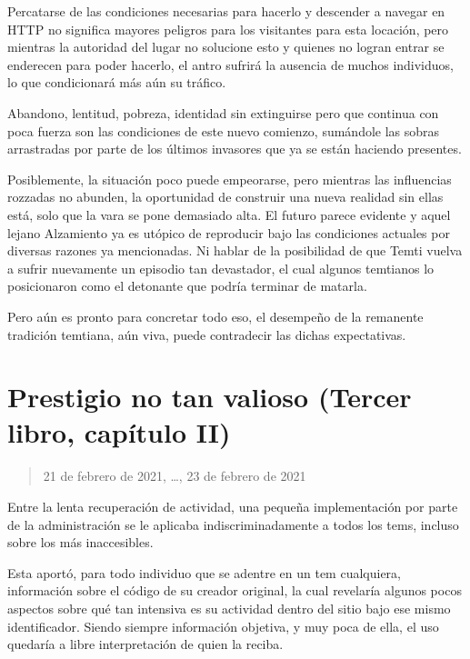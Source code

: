 \documentclass[
]{book}
\begin{document}
Percatarse de las condiciones necesarias para hacerlo y descender a navegar en HTTP no significa mayores peligros para los visitantes para esta locación, pero mientras la autoridad del lugar no solucione esto y quienes no logran entrar se enderecen para poder hacerlo, el antro sufrirá la ausencia de muchos individuos, lo que condicionará más aún su tráfico.

Abandono, lentitud, pobreza, identidad sin extinguirse pero que continua con poca fuerza son las condiciones de este nuevo comienzo, sumándole las sobras arrastradas por parte de los últimos invasores que ya se están haciendo presentes.

Posiblemente, la situación poco puede empeorarse, pero mientras las influencias rozzadas no abunden, la oportunidad de construir una nueva realidad sin ellas está, solo que la vara se pone demasiado alta. El futuro parece evidente y aquel lejano Alzamiento ya es utópico de reproducir bajo las condiciones actuales por diversas razones ya mencionadas. Ni hablar de la posibilidad de que Temti vuelva a sufrir nuevamente un episodio tan devastador, el cual algunos temtianos lo posicionaron como el detonante que podría terminar de matarla.

Pero aún es pronto para concretar todo eso, el desempeño de la remanente tradición temtiana, aún viva, puede contradecir las dichas expectativas.

\hypertarget{prestigio-no-tan-valioso-tercer-libro-capuxedtulo-ii}{%
\section{Prestigio no tan valioso (Tercer libro, capítulo II)}\label{prestigio-no-tan-valioso-tercer-libro-capuxedtulo-ii}}

\begin{quote}
21 de febrero de 2021, \ldots, 23 de febrero de 2021
\end{quote}

Entre la lenta recuperación de actividad, una pequeña implementación por parte de la administración se le aplicaba indiscriminadamente a todos los tems, incluso sobre los más inaccesibles.

Esta aportó, para todo individuo que se adentre en un tem cualquiera, información sobre el código de su creador original, la cual revelaría algunos pocos aspectos sobre qué tan intensiva es su actividad dentro del sitio bajo ese mismo identificador. Siendo siempre información objetiva, y muy poca de ella, el uso quedaría a libre interpretación de quien la reciba.
\end{document}
